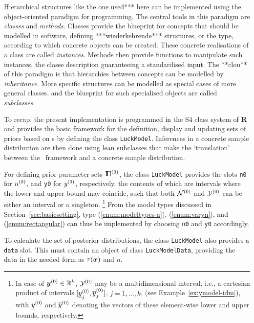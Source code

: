 Hierarchical structures like the one used*** here
can be implemented using the object-oriented paradigm for programming.
The central tools in this paradigm are \emph{classes} and \emph{methods}.
Classes provide the blueprint for concepts that should be modelled in software,
defining ***wiederkehrende*** structures, or the type, according to which concrete
objects can be created. These concrete realisations of a class are called \emph{instances}.
Methods then provide functions to manipulate such instances,
the classe description guaranteeing a standardised input.
The **clou** of this paradigm is that hierarchies between concepts
can be modelled by \emph{inheritance}.
More specific structures can be modelled as special cases of more general classes,
and the blueprint for such specialised objects are called \emph{subclasses}.

To recap, the present implementation is programmed in the S4 class system of
\textbf{R} and provides the basic framework for the definition, display and updating
sets of priors based on \model s by defining the class \texttt{LuckModel}.
Inferences in a concrete sample distribution are then done
using lean subclasses that make the `translation'
between the \model\ framework and a concrete sample distribution.

For defining prior parameter sets $\text{I}\!\Pi^{(0)}$,
the class \texttt{LuckModel} provides the slots \texttt{n0} for $n^{(0)}$, and \texttt{y0} for $y^{(0)}$, respectively,
the contents of which are intervals where the lower and upper bound may coincide,
such that both $\mathcal{N}^{(0)}$ and $\mathcal{Y}^{(0)}$ can be either an interval or a singleton.%
\footnote{In case of ${\bm y}^{(0)} \in \mathbb{R}^k$, $\mathcal{Y}^{(0)}$ may be a multidimensional interval,
i.e., a cartesian product of intervals $[\underline{y}^{(0)}_j,\overline{y}^{(0)}_j]$, $j=1,\ldots,k$,
(see Example~\ref{ex:ymodel-idm}),
with $\underline{y}^{(0)}$ and $\overline{y}^{(0)}$ denoting the vectors of these element-wise lower and upper bounds, respectively.} 
From the model types discussed in Section~\ref{sec:basicsetting}, type
(\ref{enum:modeltypes-a}), (\ref{enum:varyn}), and (\ref{enum:rectangular})
can thus be implemented by choosing \texttt{n0} and \texttt{y0} accordingly.

To calculate the set of posterior distributions,
the class \texttt{LuckModel} also provides a \texttt{data} slot.
This must contain an object of class \texttt{LuckModelData},
providing the data in the needed form as $\tau({\bm x})$ and $n$.

